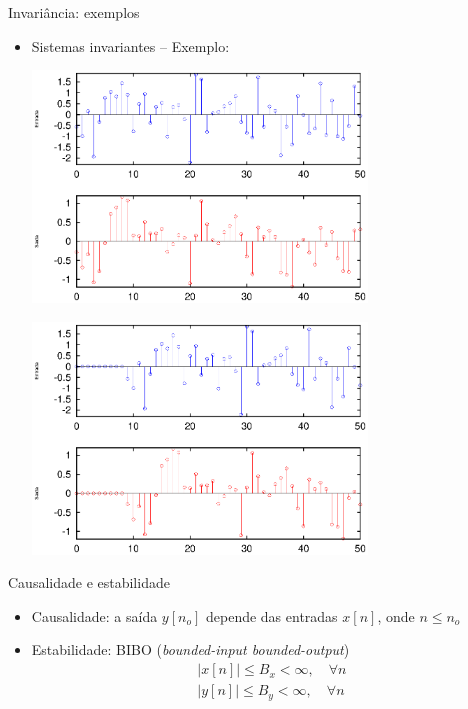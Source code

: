 \begin{slide}{Invariância: exemplos}
   \begin{itemize}
   \item Sistemas invariantes -- Exemplo:
    {
   \begin{center}
     \includegraphics[width=0.7\textwidth]{figs/invariante01.eps}
    \end{center}}
    {
   \begin{center}
     \includegraphics[width=0.7\textwidth]{figs/invariante02.eps}
    \end{center}}
   \end{itemize}
\end{slide} 

\begin{slide}{Causalidade e estabilidade}
   \begin{itemize}
    \item <1->Causalidade: a saída $y[n_o]$ depende das entradas $x[n]$, onde $n \leq n_o$
    \item <2>Estabilidade: BIBO (\textit{bounded-input bounded-output})\\
    \begin{align*}
       |x[n]| \leq B_x < \infty, \quad \forall n\\
       |y[n]| \leq B_y < \infty, \quad \forall n
    \end{align*}

  \end{itemize}
\end{slide}


